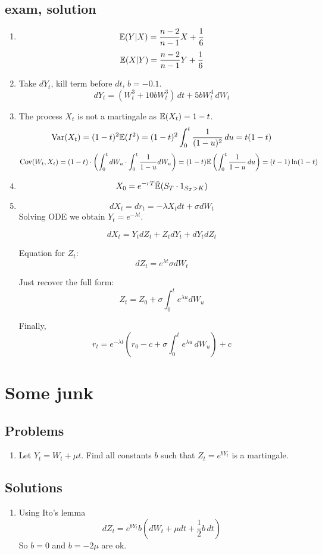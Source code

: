 \documentclass[12pt, a4paper]{article}
\begin{document}
\subsection{exam, solution}

\begin{enumerate}
\item
\[
\mathbb{E}(Y|X) = \frac{n-2}{n-1}X + \frac{1}{6}
\]
\[
\mathbb{E}(X|Y) = \frac{n-2}{n-1}Y + \frac{1}{6}
\]
\item Take $dY_t$, kill term before $dt$, $b=-0.1$.
\[
dY_t = (W_t^3 + 10bW_t^3) \, dt + 5bW_t^4 \, dW_t
\]
\item The process $X_t$ is not a martingale as $\mathbb{E}(X_t)=1-t$.
\[
\operatorname{Var}(X_t) = (1-t)^2\mathbb{E}(I^2) = (1-t)^2 \int_0^t \frac{1}{(1-u)^2} \, du = t(1-t)
\]
\[
\operatorname{Cov}(W_t, X_t) = (1-t) \cdot \left( \int_0^t dW_u \cdot \int_0^t \frac{1}{1-u}dW_u  \right) = (1-t) \mathbb{E}\left( \int_0^t \frac{1}{1-u} \, du \right) = (t-1)\ln(1-t)
\]
\item
\[
X_0 = e^{-rT}\tilde{\mathbb{E}}(S_T \cdot 1_{S_T>K})
\]
\item
\[
dX_t = dr_t = -\lambda X_t dt + \sigma dW_t
\]
Solving ODE we obtain $Y_t = e^{-\lambda t}$.

\[
dX_t = Y_t dZ_t + Z_t dY_t + dY_t dZ_t
\]

Equation for $Z_t$:
\[
dZ_t = e^{\lambda t}\sigma dW_t
\]

Just recover the full form:
\[
Z_t = Z_0 + \sigma \int_0^t e^{\lambda u} dW_u
\]

Finally,
\[
r_t = e^{-\lambda t}\left(r_0 - c + \sigma \int_0^t e^{\lambda u} \, dW_u  \right) + c
\]

\end{enumerate}

\section{Some junk}

\subsection{Problems}
\begin{enumerate}
\item Let $Y_t = W_t +\mu t$. Find all constants $b$ such that $Z_t = e^{bY_t}$ is a martingale.

\end{enumerate}

\subsection{Solutions}
\begin{enumerate}
\item Using Ito's lemma
\[
dZ_t = e^{bY_t}b \left(dW_t + \mu dt + \frac{1}{2}b \, dt \right)
\]
So $b=0$ and $b=-2\mu$ are ok.

\end{enumerate}
\end{document}
